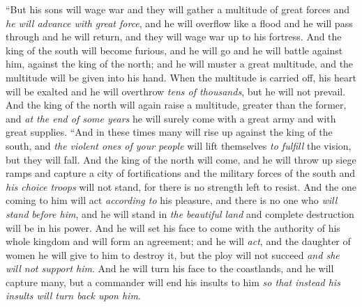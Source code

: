 \begin{biblechapter}
\verse “But his sons will wage war and they will gather a multitude of great forces and \textit{he will advance with great force}, and he will overflow like a flood and he will pass through and he will return, and they will wage war up to his fortress.
\verse And the king of the south will become furious, and he will go and he will battle against him, against the king of the north; and he will muster a great multitude, and the multitude will be given into his hand.
\verse When the multitude is carried off, his heart will be exalted and he will overthrow \textit{tens of thousands}, but he will not prevail.
\verse And the king of the north will again raise a multitude, greater than the former, and \textit{at the end of some years} he will surely come with a great army and with great supplies.
\verse “And in these times many will rise up against the king of the south, and \textit{the violent ones of your people} will lift themselves \textit{to fulfill} the vision, but they will fall.
\verse And the king of the north will come, and he will throw up siege ramps and capture a city of fortifications and the military forces of the south and \textit{his choice troops} will not stand, for there is no strength left to resist.
\verse And the one coming to him will act \textit{according to} his pleasure, and there is no one who \textit{will stand} \textit{before him}, and he will stand in \textit{the beautiful land} and complete destruction will be in his power.
\verse And he will set his face to come with the authority of his whole kingdom and will form an agreement; and he will \textit{act}, and the daughter of women he will give to him to destroy it, but the ploy will not succeed \textit{and she will not support him}.
\verse And he will turn his face to the coastlands, and he will capture many, but a commander will end his insults to him \textit{so that instead his insults will turn back upon him}.

\end{biblechapter}
